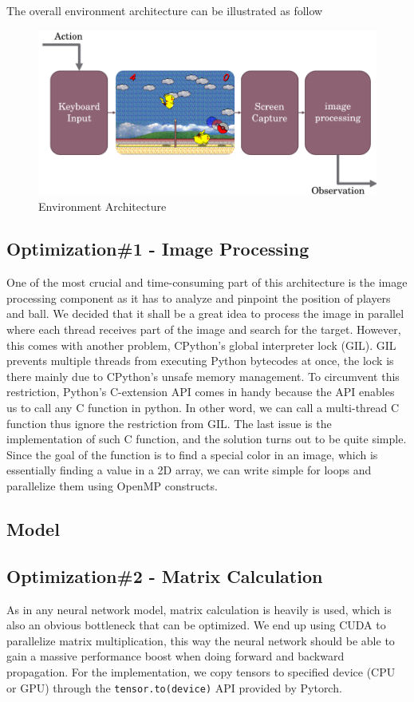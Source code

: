 \documentclass[sigconf]{acmart}
\begin{document}
The overall environment architecture can be illustrated as follow
\begin{figure}[h]
  \centering
  \includegraphics[width=\columnwidth]{env.png}
  \caption{Environment Architecture}
\end{figure}


\subsection*{Optimization\#1 - Image Processing}
One of the most crucial and time-consuming part of this architecture is the image processing component as it has to analyze and pinpoint the position of players and ball. We decided that it shall be a great idea to process the image in parallel where each thread receives part of the image and search for the target. However, this comes with another problem, CPython’s global interpreter lock (GIL). GIL prevents multiple threads from executing Python bytecodes at once, the lock is there mainly due to CPython’s unsafe memory management. To circumvent this restriction, Python’s C-extension API comes in handy because the API enables us to call any C function in python. In other word, we can call a multi-thread C function thus ignore the restriction from GIL. The last issue is the implementation of such C function, and the solution turns out to be quite simple. Since the goal of the function is to find a special color in an image, which is essentially finding a value in a 2D array, we can write simple for loops and parallelize them using OpenMP constructs.

\subsection{Model}
\subsection*{Optimization\#2 - Matrix Calculation}
As in any neural network model, matrix calculation is heavily is used, which is also an obvious bottleneck that can be optimized. We end up using CUDA to parallelize matrix multiplication, this way the neural network should be able to gain a massive performance boost when doing forward and backward propagation. For the implementation, we copy tensors to specified device (CPU or GPU) through the \lstinline|tensor.to(device)| API provided by Pytorch\cite{NEURIPS2019_9015}.
\end{document}
